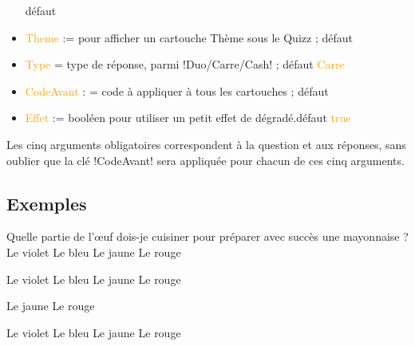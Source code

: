 \documentclass[french,a4paper,11pt]{article}
\newcommand\Cle[1]{{\small\sffamily\textlangle \textcolor{orange}{#1}\textrangle}}
\newcommand\cmaj[1]{\tcbox[vignetteMaJ]{#1}\xspace}
\begin{document}
\begin{tipblock}
\begin{itemize}
	\hfill{}défaut \Cle{}
	\item \Cle{Theme} := pour afficher un cartouche \textsf{Thème} sous le Quizz ; \hfill{}défaut \Cle{}
	\item \Cle{Type} = type de réponse, parmi \motcletex!Duo/Carre/Cash! ; \hfill{}défaut \Cle{Carre}
	\item \cmaj{0.1.1} \Cle{CodeAvant} : = code à appliquer à tous les cartouches ; \hfill{}défaut \Cle{}
	\item \Cle{Effet} := booléen pour utiliser un petit effet de dégradé.\hfill{}défaut \Cle{true}
\end{itemize}
\vspace*{-\baselineskip}\leavevmode
\end{tipblock}

\begin{tipblock}
Les cinq arguments obligatoires correspondent à la question et aux réponses, sans oublier que la clé \motcletex!CodeAvant! sera appliquée pour chacun de ces cinq arguments.
\end{tipblock}

\subsection{Exemples}

\begin{DemoCode}[]
\QuizzPrendrePlace
	{Quelle partie de l'\oe{}uf dois-je cuisiner pour préparer avec succès une mayonnaise ?}
	{Le violet} {Le bleu}
	{Le jaune} {Le rouge}
\end{DemoCode}

\begin{DemoCode}[]
	{Le violet} {Le bleu}
	{Le jaune} {Le rouge}
\end{DemoCode}

\begin{DemoCode}[]
	{} {}
	{Le jaune} {Le rouge}
\end{DemoCode}

\begin{DemoCode}[]
	{Le violet} {Le bleu}
	{Le jaune} {Le rouge}
\end{DemoCode}
\end{document}
